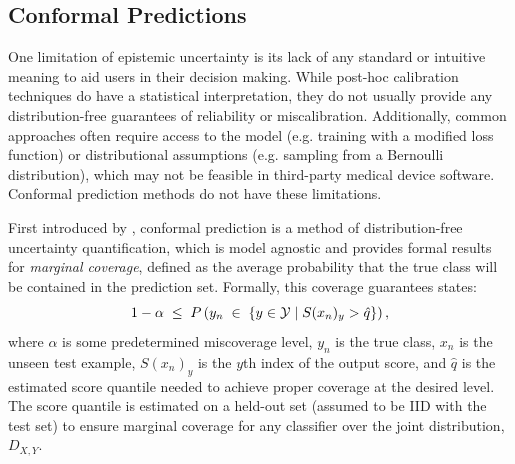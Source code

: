 \documentclass[letterpaper]{article} %
\begin{document}
    \subsection{Conformal Predictions}
    
        One limitation of epistemic uncertainty is its lack of any standard or intuitive meaning to aid users in their decision making.
        While post-hoc calibration techniques do have a statistical interpretation, they do not usually provide any distribution-free guarantees of reliability or miscalibration.
        Additionally, common approaches often require access to the model (e.g. training with a modified loss function) or distributional assumptions (e.g. sampling from a Bernoulli distribution), which may not be feasible in third-party medical device software.
        Conformal prediction methods do not have these limitations.
        
        First introduced by \citet{vovk}, conformal prediction is a method of distribution-free uncertainty quantification, which is model agnostic and provides formal results for \textit{marginal coverage}, defined as the average probability that the true class will be contained in the prediction set.
        Formally, this coverage guarantees states:
        \begin{equation}
            \small
            1 - \alpha \; \leq \; P\left(y_n \; \in \; \left\{y \in \mathcal{Y} \mid S(x_n)_y > \hat{q} \right\} \right),
        \end{equation}
        where $\alpha$ is some predetermined miscoverage level, $y_n$ is the true class, $x_n$ is the unseen test example, $S(x_n)_y$ is the $y$th index of the output score, and $\hat{q}$ is the estimated score quantile needed to achieve proper coverage at the desired level.
        The score quantile is estimated on a held-out set (assumed to be IID with the test set) to ensure marginal coverage for any classifier over the joint distribution, $D_{X, Y}$.
        
\end{document}
